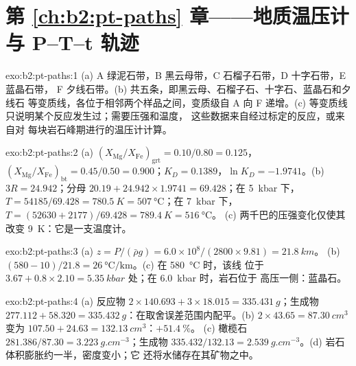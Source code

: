 \section*{第 \ref{ch:b2:pt-paths} 章——地质温压计与 P--T--t 轨迹}

\begin{solution}{exo:b2:pt-paths:1}
(a) A 绿泥石带，B 黑云母带，C 石榴子石带，D 十字石带，E 蓝晶石带，
F 夕线石带。(b) 共五条，即黑云母、石榴子石、十字石、蓝晶石和夕线石
等变质线，各位于相邻两个样品之间，变质级自 A 向 F 递增。(c) 等变质线
只说明某个反应发生过；需要压强和温度，
这些数据来自经过标定的反应，或来自对
每块岩石峰期进行的温压计计算。
\end{solution}

\begin{solution}{exo:b2:pt-paths:2}
(a) $(X_{\text{Mg}}/X_{\text{Fe}})_{\text{grt}} = 0.10/0.80 = 0.125$，
$(X_{\text{Mg}}/X_{\text{Fe}})_{\text{bt}} = 0.45/0.50 = 0.900$；$K_D = 0.1389$，$\ln K_D =
-1.9741$。(b) $3R = 24.942$；分母 $20.19 + 24.942\times1.9741 = 69.428$；在
\qty{5}{kbar} 下，$T = 54185/69.428 = \qty{780.5}{K} = \qty{507}{\celsius}$；在
\qty{7}{kbar} 下，$T = (52630 + 2177)/69.428 = \qty{789.4}{K} = \qty{516}{\celsius}$。
(c) 两千巴的压强变化仅使其改变 \qty{9}{K}：它是一支温度计。
\end{solution}

\begin{solution}{exo:b2:pt-paths:3}
(a) $z = P/(\bar\rho g) = 6.0\times10^8/(2800\times9.81) = \qty{21.8}{km}$。
(b) $(580 - 10)/21.8 = \qty{26}{\celsius\per\km}$。(c) 在 \qty{580}{\celsius} 时，该线
位于 $3.67 + 0.8\times2.10 = \qty{5.35}{kbar}$ 处；在 \qty{6.0}{kbar} 时，岩石位于
高压一侧：蓝晶石。
\end{solution}

\begin{solution}{exo:b2:pt-paths:4}
(a) 反应物 $2\times140.693 + 3\times18.015 = \qty{335.431}{g}$；生成物 $277.112 +
58.320 = \qty{335.432}{g}$：在取舍误差范围内配平。(b) $2\times43.65 =
\qty{87.30}{cm^3}$ 变为 $107.50 + 24.63 = \qty{132.13}{cm^3}$：$+\qty{51.4}{\percent}$。
(c) 橄榄石 $281.386/87.30 = \qty{3.223}{g.cm^{-3}}$；生成物 $335.432/132.13 =
\qty{2.539}{g.cm^{-3}}$。(d) 岩石体积膨胀约一半，密度变小；它
还将水储存在其矿物之中。
\end{solution}

